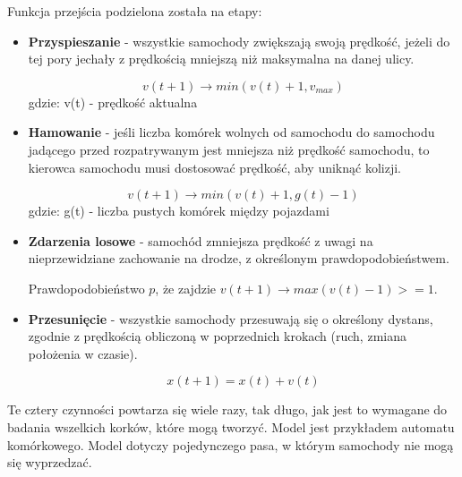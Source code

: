 \documentclass{sprawozdanie-agh}
\begin{document}
		Funkcja przejścia podzielona została na etapy:

		\begin{itemize}
			\item{\textbf{Przyspieszanie} - wszystkie samochody zwiększają swoją prędkość, jeżeli do tej pory jechały z prędkością mniejszą niż maksymalna na danej ulicy.}

			\begin{equation}
				v(t+1) \rightarrow min(v(t)+1,v_{max})
			\end{equation}
			gdzie: v(t) - prędkość aktualna

			\item{\textbf{Hamowanie} - jeśli liczba komórek wolnych od samochodu do samochodu jadącego przed rozpatrywanym jest mniejsza niż prędkość samochodu, to kierowca samochodu musi dostosować prędkość, aby uniknąć kolizji.}

			\begin{equation}
				v(t+1) \rightarrow min(v(t)+1,g(t)-1)
			\end{equation}
			gdzie: g(t) - liczba pustych komórek między pojazdami

			\item{\textbf{Zdarzenia losowe} - samochód zmniejsza prędkość z uwagi na nieprzewidziane zachowanie na drodze, z określonym prawdopodobieństwem.}

			Prawdopodobieństwo $p$, że zajdzie $v(t+1) \rightarrow max(v(t)-1)>=1$.

			\item{\textbf{Przesunięcie} - wszystkie samochody przesuwają się o określony dystans, zgodnie z prędkością obliczoną w poprzednich krokach (ruch, zmiana położenia w czasie).}

			\begin{equation}
				x(t+1)=x(t)+v(t)
			\end{equation}

		\end{itemize}

		Te cztery czynności powtarza się wiele razy, tak długo, jak jest to wymagane do badania wszelkich korków, które mogą tworzyć. Model jest przykładem automatu komórkowego. Model dotyczy pojedynczego pasa, w którym samochody nie mogą się wyprzedzać.
\end{document}
